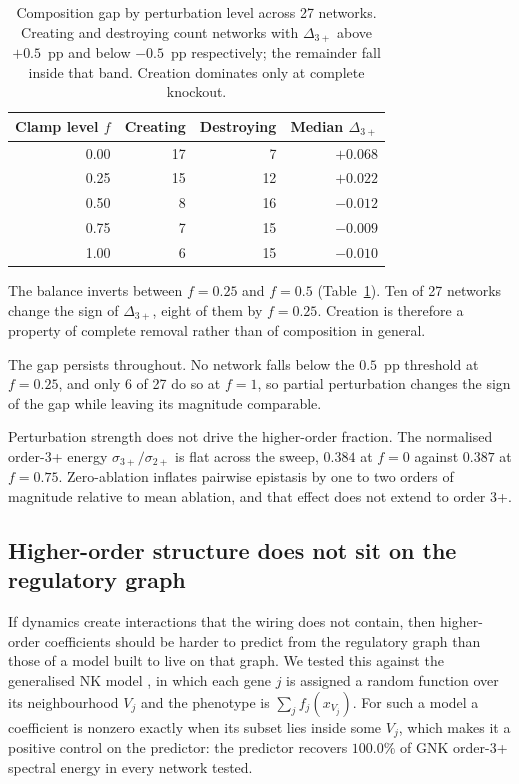 \documentclass[10pt]{article}
\begin{document}
\begin{table}[h]
\centering\small
\begin{tabular}{rrrr}
\toprule
Clamp level $f$ & Creating & Destroying & Median $\Delta_{3+}$ \\
\midrule
0.00 & 17 & 7  & $+0.068$ \\
0.25 & 15 & 12 & $+0.022$ \\
0.50 & 8  & 16 & $-0.012$ \\
0.75 & 7  & 15 & $-0.009$ \\
1.00 & 6  & 15 & $-0.010$ \\
\bottomrule
\end{tabular}
\caption{Composition gap by perturbation level across 27 networks.
Creating and destroying count networks with $\Delta_{3+}$ above
$+0.5$~pp and below $-0.5$~pp respectively; the remainder fall inside
that band. Creation dominates only at complete knockout.}
\label{tab:graded}
\end{table}

The balance inverts between $f = 0.25$ and $f = 0.5$
(Table~\ref{tab:graded}). Ten of 27 networks change the sign of
$\Delta_{3+}$, eight of them by $f = 0.25$. Creation is therefore a
property of complete removal rather than of composition in general.

The gap persists throughout. No network falls below the $0.5$~pp
threshold at $f = 0.25$, and only 6 of 27 do so at $f = 1$, so partial
perturbation changes the sign of the gap while leaving its magnitude
comparable.

Perturbation strength does not drive the higher-order fraction. The
normalised order-3+ energy $\sigma_{3+}/\sigma_{2+}$ is flat across the
sweep, $0.384$ at $f = 0$ against $0.387$ at $f = 0.75$. Zero-ablation
inflates pairwise epistasis by one to two orders of magnitude relative
to mean ablation, and that effect does not extend to order 3+.


\subsection{Higher-order structure does not sit on the regulatory graph}
\label{sec:gnk}

If dynamics create interactions that the wiring does not contain, then
higher-order coefficients should be harder to predict from the
regulatory graph than those of a model built to live on that graph. We
tested this against the generalised NK model \citep{brookes2022sparsity},
in which each gene $j$ is assigned a random function over its
neighbourhood $V_j$ and the phenotype is $\sum_j f_j(x_{V_j})$. For such
a model a coefficient is nonzero exactly when its subset lies inside
some $V_j$, which makes it a positive control on the predictor: the
predictor recovers $100.0\%$ of GNK order-3+ spectral energy in every
network tested.
\end{document}
